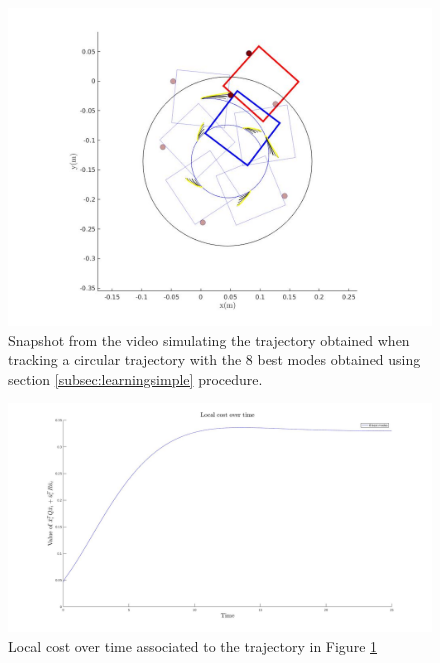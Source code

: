 \documentclass[12,twoside]{TFG-GM}
\theoremstyle{definition}
\theoremstyle{remark}
\begin{document}
\begin{figure}[htb!]
\begin{center}
\includegraphics[width=16cm]{without_nominal_trajectory.jpg}
\end{center}
\caption{\label{fig:without_nominal_trajectory} \small Snapshot from the video simulating the trajectory obtained when tracking a circular trajectory with the 8 best modes obtained using section \ref{subsec:learningsimple} procedure.}
\end{figure}

\begin{figure}[htb!]
\begin{center}
\includegraphics[width=16cm]{without_nominal_local_cost.jpg}
\end{center}
\caption{\label{fig:without_nominal_local_cost} \small Local cost over time associated to the trajectory in Figure \ref{fig:without_nominal_trajectory}}
\end{figure}
\end{document}

